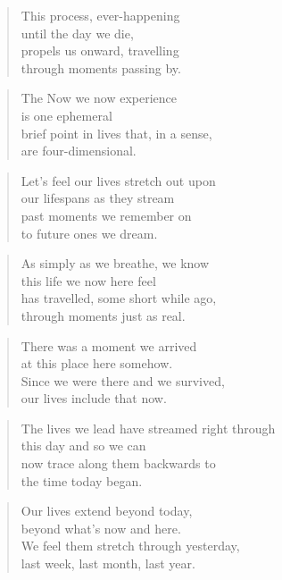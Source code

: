 \documentclass[14pt,a4paper]{article}
\begin{document}
\begin{verse}
This process, ever-happening\\
until the day we die,\\
propels us onward, travelling\\
through moments passing by.
\end{verse}

\begin{verse}
The Now we now experience\\
is one ephemeral\\
brief point in lives that, in a sense,\\
are four-dimensional.
\end{verse}

\begin{verse}
Let’s feel our lives stretch out upon\\
our lifespans as they stream\\
past moments we remember on\\
to future ones we dream.
\end{verse}

\begin{verse}
As simply as we breathe, we know\\
this life we now here feel\\
has travelled, some short while ago,\\
through moments just as real.
\end{verse}

\begin{verse}
There was a moment we arrived\\
at this place here somehow.\\
Since we were there and we survived,\\
our lives include that now.
\end{verse}

\begin{verse}
The lives we lead have streamed right through\\
this day and so we can\\
now trace along them backwards to\\
the time today began.
\end{verse}

\begin{verse}
Our lives extend beyond today,\\
beyond what’s now and here.\\
We feel them stretch through yesterday,\\
last week, last month, last year.
\end{verse}
\end{document}
